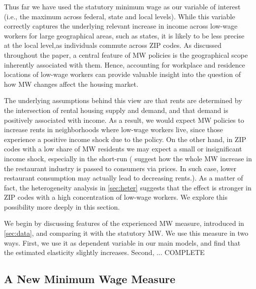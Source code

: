 
Thus far we have used the statutory minimum wage as our variable of interest (i.e., 
the maximum across federal, state and local levels). While this variable correctly 
captures the underlying relevant increase in income across low-wage workers for large
geographical areas, such as states, it is likely to be less precise at the local level,as 
individuals commute across ZIP codes. As discussed throughout the paper, a central feature of MW 
policies is the geographical scope inherently associated with them. Hence, accounting 
for workplace and residence locations of low-wage workers can provide valuable insight 
into the question of how MW changes affect the housing market. 

The underlying assumptions behind this view are that rents are determined by the 
intersection of rental housing supply and demand, and that demand is
positively associated with income. As a result, we would expect MW policies to increase 
rents in neighborhoods where low-wage workers live, since those experience a positive
income shock due to the policy. On the other hand,  in ZIP codes with a low share 
of MW residents we may expect a small or insignificant income shock, especially 
in the short-run (\cite{allegretto2018local} suggest how the whole MW increase in 
the restaurant industry is passed to consumers via prices. In such case, lower 
restaurant consumption may actually lead to decreasing rents.). 
As a matter of fact, the heterogeneity analysis in 
\autoref{sec:heter} suggests that the effect is stronger in ZIP codes with a high
concentration of low-wage workers. We explore this possibility more deeply in this 
section.

We begin by discussing features of the experienced MW measure, 
introduced in \autoref{sec:data}, and comparing it with the statutory MW. 
We use this measure in two ways. First, we use it as dependent variable in our main models, 
and find that the estimated elasticity slightly increases. Second, ... COMPLETE

\subsection{A New Minimum Wage Measure}

